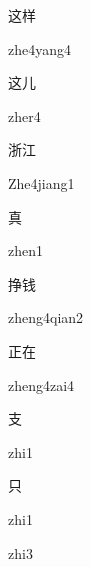 \begin{verbete}{这样}
\begin{pronuncia}{zhe4yang4}
\end{pronuncia}
\end{verbete}

\begin{verbete}[zher4]{这儿}
\begin{pronuncia}{zher4}
\end{pronuncia}
\end{verbete}

\begin{verbete}{浙江}
\begin{pronuncia}{Zhe4jiang1}
\end{pronuncia}
\end{verbete}

\begin{verbete}[zhen1]{真}
\begin{pronuncia}{zhen1}
\end{pronuncia}
\end{verbete}

\begin{verbete}{挣钱}
\begin{pronuncia}{zheng4qian2}
\end{pronuncia}
\end{verbete}

\begin{verbete}{正在}
\begin{pronuncia}{zheng4zai4}
\end{pronuncia}
\end{verbete}

\begin{verbete}[zhi1]{支}
\begin{pronuncia}{zhi1}
\end{pronuncia}
\end{verbete}

\begin{verbete}[zhi1]{只}
\begin{pronuncia}{zhi1}
\end{pronuncia}
\begin{pronuncia}{zhi3}
\end{pronuncia}
\end{verbete}

